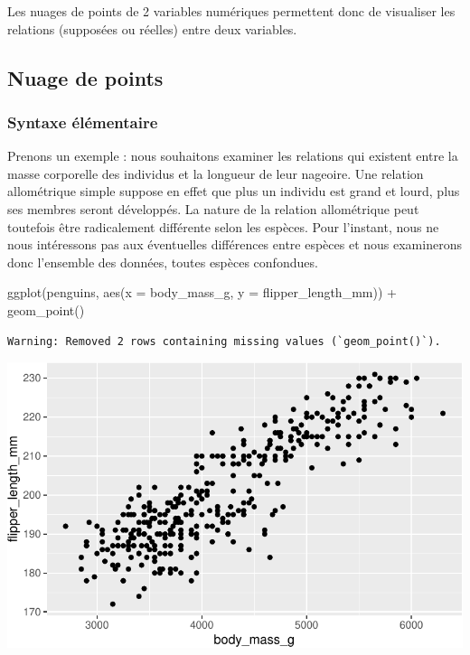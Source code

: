 \documentclass[
  a4paper,
  DIV=11,
  numbers=noendperiod,
  oneside]{scrreprt}
\newenvironment{Shaded}{}{}
\newcommand{\AttributeTok}[1]{\textcolor[rgb]{0.84,0.23,0.29}{#1}}
\newcommand{\FunctionTok}[1]{\textcolor[rgb]{0.44,0.26,0.76}{#1}}
\newcommand{\NormalTok}[1]{\textcolor[rgb]{0.14,0.16,0.18}{#1}}
\newcommand{\SpecialCharTok}[1]{\textcolor[rgb]{0.00,0.36,0.77}{#1}}
\begin{document}
Les nuages de points de 2 variables numériques permettent donc de
visualiser les relations (supposées ou réelles) entre deux variables.

\subsection{Nuage de points}\label{nuage-de-points}

\subsubsection{Syntaxe élémentaire}\label{syntaxe-uxe9luxe9mentaire-1}

Prenons un exemple : nous souhaitons examiner les relations qui existent
entre la masse corporelle des individus et la longueur de leur nageoire.
Une relation allométrique simple suppose en effet que plus un individu
est grand et lourd, plus ses membres seront développés. La nature de la
relation allométrique peut toutefois être radicalement différente selon
les espèces. Pour l'instant, nous ne nous intéressons pas aux
éventuelles différences entre espèces et nous examinerons donc
l'ensemble des données, toutes espèces confondues.

\begin{Shaded}
\begin{Highlighting}[]
\FunctionTok{ggplot}\NormalTok{(penguins, }\FunctionTok{aes}\NormalTok{(}\AttributeTok{x =}\NormalTok{ body\_mass\_g, }\AttributeTok{y =}\NormalTok{ flipper\_length\_mm)) }\SpecialCharTok{+}
  \FunctionTok{geom\_point}\NormalTok{()}
\end{Highlighting}
\end{Shaded}

\begin{verbatim}
Warning: Removed 2 rows containing missing values (`geom_point()`).
\end{verbatim}

\includegraphics{03-visualization_files/figure-pdf/unnamed-chunk-47-1.pdf}
\end{document}
